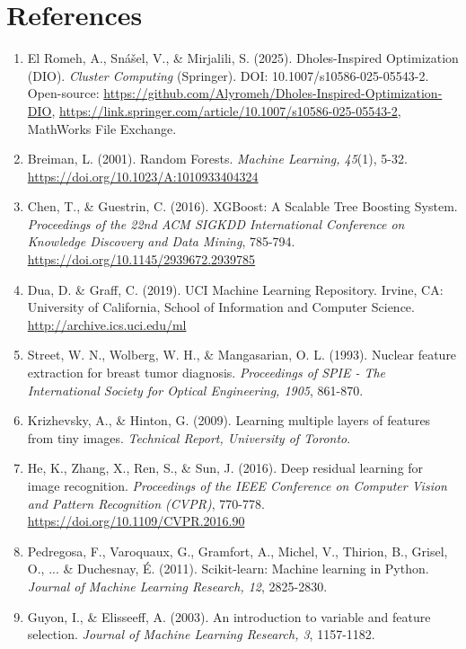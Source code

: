 \documentclass[12pt, a4paper]{article}
\begin{document}
\section*{References}
\begin{enumerate}
    \item El Romeh, A., Snášel, V., \& Mirjalili, S. (2025). Dholes-Inspired Optimization (DIO). \textit{Cluster Computing} (Springer). DOI: 10.1007/s10586-025-05543-2. Open-source: \url{https://github.com/Alyromeh/Dholes-Inspired-Optimization-DIO}, \url{https://link.springer.com/article/10.1007/s10586-025-05543-2}, MathWorks File Exchange.
    
    \item Breiman, L. (2001). Random Forests. \textit{Machine Learning, 45}(1), 5-32. \url{https://doi.org/10.1023/A:1010933404324}
    
    \item Chen, T., \& Guestrin, C. (2016). XGBoost: A Scalable Tree Boosting System. \textit{Proceedings of the 22nd ACM SIGKDD International Conference on Knowledge Discovery and Data Mining}, 785-794. \url{https://doi.org/10.1145/2939672.2939785}
    
    \item Dua, D. \& Graff, C. (2019). UCI Machine Learning Repository. Irvine, CA: University of California, School of Information and Computer Science. \url{http://archive.ics.uci.edu/ml}
    
    \item Street, W. N., Wolberg, W. H., \& Mangasarian, O. L. (1993). Nuclear feature extraction for breast tumor diagnosis. \textit{Proceedings of SPIE - The International Society for Optical Engineering, 1905}, 861-870.
    
    \item Krizhevsky, A., \& Hinton, G. (2009). Learning multiple layers of features from tiny images. \textit{Technical Report, University of Toronto}.
    
    \item He, K., Zhang, X., Ren, S., \& Sun, J. (2016). Deep residual learning for image recognition. \textit{Proceedings of the IEEE Conference on Computer Vision and Pattern Recognition (CVPR)}, 770-778. \url{https://doi.org/10.1109/CVPR.2016.90}
    
    \item Pedregosa, F., Varoquaux, G., Gramfort, A., Michel, V., Thirion, B., Grisel, O., ... \& Duchesnay, É. (2011). Scikit-learn: Machine learning in Python. \textit{Journal of Machine Learning Research, 12}, 2825-2830.
    
    \item Guyon, I., \& Elisseeff, A. (2003). An introduction to variable and feature selection. \textit{Journal of Machine Learning Research, 3}, 1157-1182.
\end{enumerate}

\newpage
\end{document}
